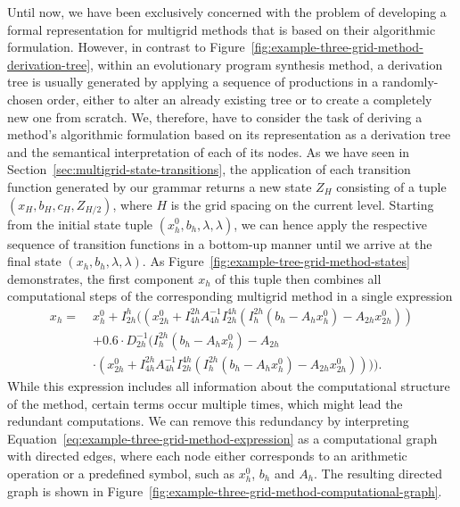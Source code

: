 Until now, we have been exclusively concerned with the problem of developing a formal representation for multigrid methods that is based on their algorithmic formulation.
However, in contrast to Figure~\ref{fig:example-three-grid-method-derivation-tree}, within an evolutionary program synthesis method, a derivation tree is usually generated by applying a sequence of productions in a randomly-chosen order, either to alter an already existing tree or to create a completely new one from scratch.
We, therefore, have to consider the task of deriving a method's algorithmic formulation based on its representation as a derivation tree and the semantical interpretation of each of its nodes.
As we have seen in Section~\ref{sec:multigrid-state-transitions}, the application of each transition function generated by our grammar returns a new state $Z_H$ consisting of a tuple $\left( x_{H}, b_{H}, c_{H}, Z_{H/2}\right)$, where $H$ is the grid spacing on the current level.
Starting from the initial state tuple $\left(x_{h}^0, b_{h}, \lambda, \lambda\right)$, we can hence apply the respective sequence of transition functions in a bottom-up manner until we arrive at the final state $\left(x_{h}, b_{h}, \lambda, \lambda\right)$.
As Figure~\ref{fig:example-tree-grid-method-states} demonstrates, the first component $x_{h}$ of this tuple then combines all computational steps of the corresponding multigrid method in a single expression
\begin{equation}\tag{4.7}
	\begin{split}
		x_h = \; & x_{h}^0 + I_{2h}^h ((x_{2h}^0 + I_{4h}^{2h} A_{4h}^{-1} I_{2h}^{4h} (I_{h}^{2h}(b_{h} - A_h x_{h}^0) - A_{2h} x_{2h}^0)) \\
		& + 0.6 \cdot D_{2h}^{-1} (I_{h}^{2h}(b_{h} - A_h x_{h}^0) - A_{2h} \\
		& \cdot (x_{2h}^0 + I_{4h}^{2h} A_{4h}^{-1} I_{2h}^{4h} (I_{h}^{2h}(b_{h} - A_h x_{h}^0) - A_{2h} x_{2h}^0)))).
		\label{eq:example-three-grid-method-expression}
	\end{split}
\end{equation}
While this expression includes all information about the computational structure of the method, certain terms occur multiple times, which might lead the redundant computations.
We can remove this redundancy by interpreting Equation~\eqref{eq:example-three-grid-method-expression} as a computational graph with directed edges, where each node either corresponds to an arithmetic operation or a predefined symbol, such as $x^0_h$, $b_h$ and $A_h$.
The resulting directed graph is shown in Figure~\ref{fig:example-three-grid-method-computational-graph}.
